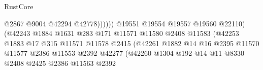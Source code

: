 \begin{lexlean}{RustCore}
\begin{coremodule}
                                                          @2867
                                                          @9004
                                                          @42294
                                                          @42778))))))
                                              @19551
                                              @19554
                                              @19557
                                              @19560
                                              @22110)
                                            (@42243
                                              @1884
                                              @1631
                                              @283
                                              @171
                                              @11571
                                              @11580
                                              @2408
                                              @11583
                                              (@42253
                                                @1883
                                                @17
                                                @315
                                                @11571
                                                @11578
                                                @2415
                                                (@42261
                                                  @1882
                                                  @14
                                                  @16
                                                  @2395
                                                  @11570
                                                  @11577
                                                  @2386
                                                  @11553
                                                  @2392
                                                  @42277
                                                  (@42260
                                                    @1304
                                                    @192
                                                    @14
                                                    @11
                                                    @8330
                                                    @2408
                                                    @2425
                                                    @2386
                                                    @11563
                                                    @2392

\end{coremodule}
\end{lexlean}
